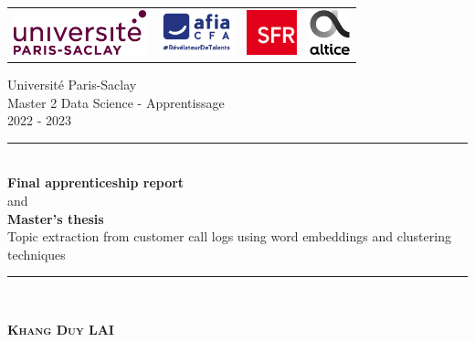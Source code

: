 \documentclass[11pt]{book}
\newcommand{\HRule}{\rule{\linewidth}{0.7mm}}
\newcommand{\Hrule}{\rule{\linewidth}{0.3mm}}
\begin{document}
	
	\begin{titlepage}
		\begin{center}
			\begin{tabular}{c@{\hskip 1.5cm}c@{\hskip 1.5cm}c@{\hskip 1.5cm}c}
				\includegraphics[height=1.3cm]{images/Saclay.png} &
				\includegraphics[height=1.3cm]{images/CFA.jpg} &
                \includegraphics[height=1.3cm]{images/SFR.png} &
                \includegraphics[height=1.3cm]{images/Altice.png} \\
			\end{tabular}
		\end{center}
	
		
		\begin{center}

			Université Paris-Saclay\\
			Master 2 Data Science - Apprentissage\\
            2022 - 2023
  
  			\vfill
  			
	 		\HRule \\[0.1cm]
	 		 { \Large {\bfseries Final apprenticeship report} \\
                            and \\
                            {\bfseries Master's thesis} \\
                            Topic extraction from customer call logs using word embeddings and
                            clustering techniques
                            }
	  		\Hrule \\
		
		\end{center}
		
		\vfill
			
		\begin{center}
			\textsc{\Large \textbf{Khang Duy LAI}}\\[1cm] 
		

\end{center}
\end{titlepage}
\end{document}
